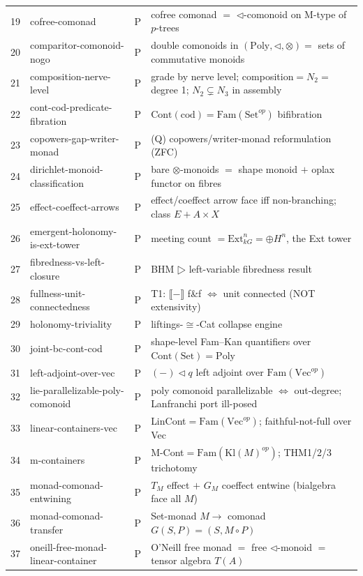 \documentclass[11pt]{article}
\begin{document}
{\begin{center}
\begin{tabular}{@{}rllp{6.2cm}@{}}
19 & cofree-comonad & P & cofree comonad $=$ $\triangleleft$-comonoid on M-type of $p$-trees \\
20 & comparitor-comonoid-nogo & P & double comonoids in $(\mathrm{Poly},\triangleleft,\otimes)=$ sets of commutative monoids \\
21 & composition-nerve-level & P & grade by nerve level; composition$=N_2=$degree 1; $N_2⊊N_3$ in assembly \\
22 & cont-cod-predicate-fibration & P & $\mathrm{Cont}(\mathrm{cod})=\mathrm{Fam}(\mathrm{Set}^{op})$ bifibration \\
23 & copowers-gap-writer-monad & P & (Q) copowers/writer-monad reformulation (ZFC) \\
24 & dirichlet-monoid-classification & P & bare $\otimes$-monoids $=$ shape monoid $+$ oplax functor on fibres \\
25 & effect-coeffect-arrows & P & effect/coeffect arrow face iff non-branching; class $E+A\times X$ \\
26 & emergent-holonomy-is-ext-tower & P & meeting count $=\mathrm{Ext}^n_{kG}=\oplus H^n$, the Ext tower \\
27 & fibredness-vs-left-closure & P & BHM $▷$ left-variable fibredness result \\
28 & fullness-unit-connectedness & P & T1: $⟦-⟧$ f\&f $\iff$ unit connected (NOT extensivity) \\
29 & holonomy-triviality & P & liftings-$\cong$-Cat collapse engine \\
30 & joint-bc-cont-cod & P & shape-level Fam--Kan quantifiers over $\mathrm{Cont}(\mathrm{Set})=\mathrm{Poly}$ \\
31 & left-adjoint-over-vec & P & $(-)\triangleleft q$ left adjoint over $\mathrm{Fam}(\mathrm{Vec}^{op})$ \\
32 & lie-parallelizable-poly-comonoid & P & poly comonoid parallelizable $\iff$ out-degree; Lanfranchi port ill-posed \\
33 & linear-containers-vec & P & LinCont$=\mathrm{Fam}(\mathrm{Vec}^{op})$; faithful-not-full over Vec \\
34 & m-containers & P & M-Cont$=\mathrm{Fam}(\mathrm{Kl}(M)^{op})$; THM1/2/3 trichotomy \\
35 & monad-comonad-entwining & P & $T_M$ effect $+$ $G_M$ coeffect entwine (bialgebra face all $M$) \\
36 & monad-comonad-transfer & P & Set-monad $M\to$ comonad $G(S,P)=(S,M\circ P)$ \\
37 & oneill-free-monad-linear-container & P & O'Neill free monad $=$ free $\triangleleft$-monoid $=$ tensor algebra $T(A)$ \\

\end{tabular}
\end{center}}
\end{document}
